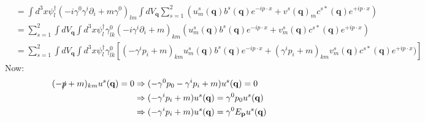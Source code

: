 \documentclass[12pt,a4]{article}
\begin{document}
\begin{enumerate}
\begin{align*}
        &=  \int d^3 x\psi^\dagger_{l} (-i \gamma^0 \gamma^i \partial_i + m\gamma^0 )_{lm} \int d V_\mathbf{q} \sum_{s = 1}^2(u^s_m(\mathbf{q}) b ^s (\mathbf{q})e^{- i p \cdot x} + v^s(\mathbf{q})_m c ^{s*} (\mathbf{q})e^{+ i p \cdot x})\\
        &= \sum_{s = 1}^2 \int d V_\mathbf{q} \int d^3 x\psi^\dagger_{l} \gamma^0_{lk} (-i  \gamma^i \partial_i + m)_{km} (u^s_m(\mathbf{q}) b ^s (\mathbf{q})e^{- i p \cdot x} + v^s_m(\mathbf{q}) c ^{s*} (\mathbf{q})e^{+ i p \cdot x})\\
        &= \sum_{s = 1}^2 \int d V_\mathbf{q} \int d^3 x\psi^\dagger_{l} \gamma^0_{lk} \left[(- \gamma^i p _i + m)_{km} u^s_m(\mathbf{q}) b ^s (\mathbf{q}) e^{- i p \cdot x} + ( \gamma^i p_i + m)_{km} v^s_m(\mathbf{q}) c ^{s*} (\mathbf{q}) e^{+ i p \cdot x} )\right]
    \end{align*}
    Now:
    \begin{align*}
      (-\slashed{p} + m)_{km} u^s(\mathbf{q}) = 0 &\Rightarrow (-\gamma^0p_0 - \gamma^i p_i + m) u^s(\mathbf{q}) = 0\\
                                             &\Rightarrow (-\gamma^i p_i + m) u^s(\mathbf{q}) = \gamma^0p_0 u^s(\mathbf{q})\\
                                             &\Rightarrow (-\gamma^i p_i + m) u^s(\mathbf{q}) = \gamma^0E_\mathbf{p} u^s(\mathbf{q})

\end{align*}
\end{enumerate}
\end{document}
